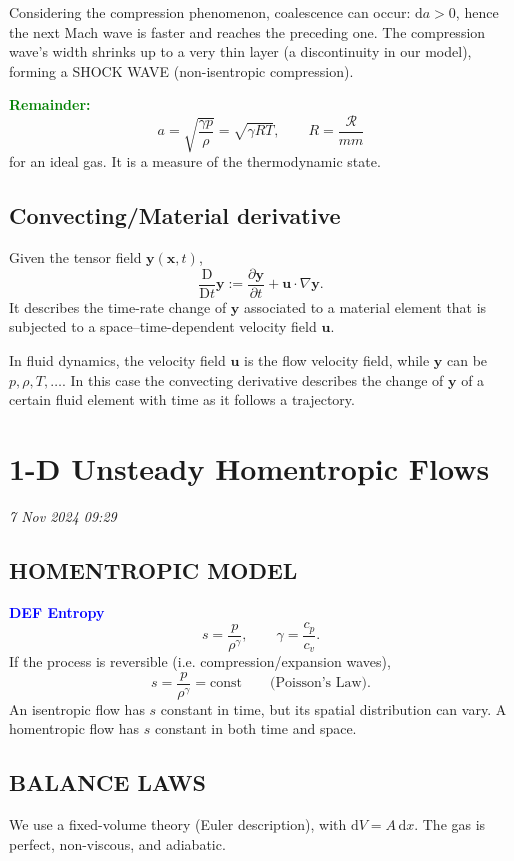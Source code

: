 \documentclass[11pt]{article}
\newcommand{\dd}{\mathrm{d}}
\newcommand{\Dt}{\frac{\mathrm{D}}{\mathrm{D}t}}
\newcommand{\vect}[1]{\boldsymbol{#1}}
\begin{document}
Considering the compression phenomenon, coalescence can occur:
\(\dd a>0\), hence the next Mach wave is faster and reaches the preceding one.
The compression wave's width shrinks up to a very thin layer (a discontinuity
in our model), forming a SHOCK WAVE (non-isentropic compression).

\textcolor{green}{\textbf{Remainder:}}\quad
\[
a=\sqrt{\frac{\gamma p}{\rho}}=\sqrt{\gamma R T},
\qquad R=\frac{\mathcal{R}}{mm}
\]
for an ideal gas. It is a measure of the thermodynamic state.

\subsection*{Convecting/Material derivative}
Given the tensor field \(\vect{y}(\vect{x},t)\),
\[
\Dt \vect{y}:=\frac{\partial \vect{y}}{\partial t}
 +\vect{u}\mathbin{\cdot}\nabla \vect{y}.
\]
It describes the time-rate change of \(\vect{y}\) associated to a material
element that is subjected to a space--time-dependent velocity field
\(\vect{u}\).

In fluid dynamics, the velocity field \(\vect{u}\) is the flow velocity field, while
\(\vect{y}\) can be \(p,\rho,T,\ldots\).  In this case the convecting
derivative describes the change of \(\vect{y}\) of a certain fluid element
with time as it follows a trajectory.

\section*{1-D Unsteady Homentropic Flows}
\textit{7 Nov 2024 09:29}

\subsection*{HOMENTROPIC MODEL}
\textcolor{blue}{\textbf{DEF Entropy}}\quad
\[
s=\frac{p}{\rho^\gamma},\qquad \gamma=\frac{c_p}{c_v}.
\]
If the process is reversible (i.e. compression/expansion waves),
\[
s=\frac{p}{\rho^\gamma}=\mathrm{const}
\qquad\text{(Poisson's Law).}
\]
An isentropic flow has \(s\) constant in time, but its spatial distribution can
vary.  A homentropic flow has \(s\) constant in both time and space.

\subsection*{BALANCE LAWS}
We use a fixed-volume theory (Euler description), with
\(\dd V=A\,\dd x\).  The gas is perfect, non-viscous, and adiabatic.
\end{document}
